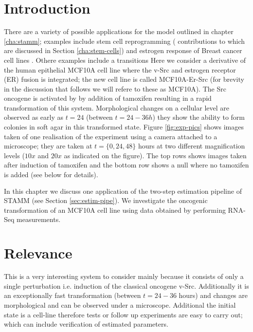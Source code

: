 \section{Introduction}
\label{sec:introduction-mcf10}

There are a variety of possible applications for the model outlined in chapter \ref{cha:stamm}; examples include stem cell reprogramming (\cite{Armond:2013} contributions to which are discussed in Section \ref{cha:stem-cells}) and estrogen response of Breast cancer cell lines \citep{Casale:2013}. Othere examples include a transitions Here we consider a derivative of the human epithelial MCF10A cell line where the v-Src and estrogen receptor (ER) fusion is integrated; the new cell line is called MCF10A-Er-Src \citep{Hirsch:2010ec} (for brevity in the discussion that follows we will refere to these as MCF10A). The Src oncogene is activated by by addition of tamoxifen resulting in a rapid transformation of this system. Morphological changes on a cellular level are observed as early as $t=24$ (between $t=24-36h$) they show the ability to form colonies in soft agar \citep{Hirsch:2010ec} in this transformed state. Figure \ref{fig:exp-pics} shows images taken of one realisation of the experiment using a camera attached to a microscope; they are taken at $t= \lbrace 0, 24, 48 \rbrace$ hours at two different magnification levels ($10x$ and $20x$ as indicated on the figure). The top rows shows images taken after induction of tamoxifen and the bottom row shows a null where no tamoxifen is added (see below for details).

In this chapter we discuss one application of the two-step estimation pipeline of STAMM (see Section \ref{sec:estim-pipe}). We investigate the oncogenic transformation of an MCF10A cell line using  data obtained by performing RNA-Seq measurements. 

\section{Relevance}
\label{sec:relevance}

This is a very interesting system to consider mainly because it consists of only a single perturbation i.e. induction of the classical oncogene v-Src. Additionally it is an exceptionally fast transformation (between $t=24-36$ hours) and changes are morphological and can be observed under a microscope. Additional the initial state is a cell-line therefore tests or follow up experiments are easy to carry out; which can include verification of estimated parameters.

